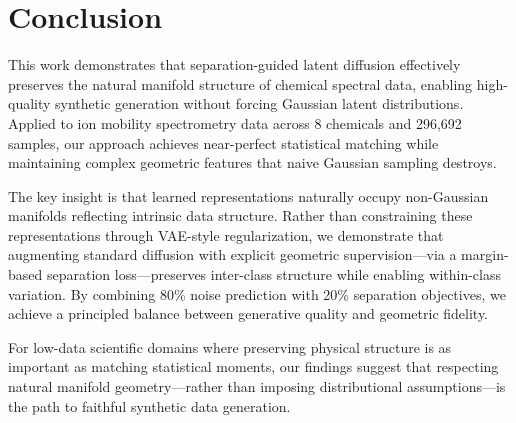 \documentclass[sigconf]{acmart}
\begin{document}
\section{Conclusion}

This work demonstrates that separation-guided latent diffusion effectively preserves the natural manifold structure of chemical spectral data, enabling high-quality synthetic generation without forcing Gaussian latent distributions. Applied to ion mobility spectrometry data across 8 chemicals and 296,692 samples, our approach achieves near-perfect statistical matching while maintaining complex geometric features that naive Gaussian sampling destroys.

The key insight is that learned representations naturally occupy non-Gaussian manifolds reflecting intrinsic data structure. Rather than constraining these representations through VAE-style regularization, we demonstrate that augmenting standard diffusion with explicit geometric supervision—via a margin-based separation loss—preserves inter-class structure while enabling within-class variation. By combining 80\% noise prediction with 20\% separation objectives, we achieve a principled balance between generative quality and geometric fidelity.

For low-data scientific domains where preserving physical structure is as important as matching statistical moments, our findings suggest that respecting natural manifold geometry—rather than imposing distributional assumptions—is the path to faithful synthetic data generation.



\end{document}
